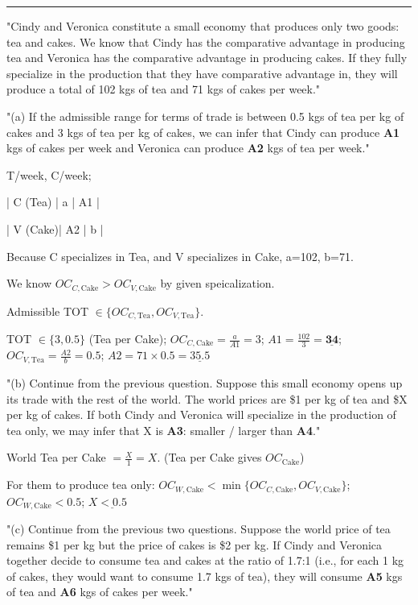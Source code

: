 \documentclass[a4paper]{article}
\begin{document}
\begin{multicols*}{3}
        \rule{1\linewidth}{0.4pt}

        "Cindy and Veronica constitute a small economy that produces only two goods: tea and cakes. We know that Cindy has the comparative advantage in producing tea and Veronica has the comparative advantage in producing cakes. If they fully specialize in the production that they have comparative advantage in, they will produce a total of 102 kgs of tea and 71 kgs of cakes per week."

        "(a) If the admissible range for terms of trade is between 0.5 kgs of tea per kg of cakes and 3 kgs of tea per kg of cakes, we can infer that Cindy can produce \textbf{A1} kgs of cakes per week and Veronica can produce \textbf{A2} kgs of tea per week."

        T/week, C/week;

        | C (Tea)   | a             | A1             |

        | V (Cake)| A2             | b             |

        Because C specializes in Tea, and V specializes in Cake, a=102, b=71.

        We know $OC_{C,\text{Cake}} > OC_{V,\text{Cake}}$ by given speicalization.

        Admissible TOT $\in \{OC_{C,\text{Tea}}, OC_{V,\text{Tea}}\}$.

        TOT $\in \{3, 0.5\}$ (Tea per Cake); $OC_{C,\text{Cake}} = \frac{a}{A1} = 3$; $A1 = \frac{102}{3} = \underline{\mathbf{34}}$; $OC_{V,\text{Tea}} = \frac{A2}{b} = 0.5$; $A2 = 71\times0.5 = \underline{\mathbf{35.5}}$

        "(b) Continue from the previous question. Suppose this small economy opens up its trade with the rest of the world. The world prices are \$1 per kg of tea and \$X per kg of cakes. If both Cindy and Veronica will specialize in the production of tea only, we may infer that X is \textbf{A3}: smaller / larger than \textbf{A4}."

        World Tea per Cake $= \frac{X}{1} = X$. (Tea per Cake gives $OC_\text{Cake}$)

        For them to produce tea only: $OC_{W,\text{Cake}} <\min\{OC_{C,\text{Cake}}, OC_{V,\text{Cake}}\}$; $OC_{W,\text{Cake}} <0.5$; $X \underline{\mathbf{<0.5}}$

        "(c) Continue from the previous two questions. Suppose the world price of tea remains \$1 per kg but the price of cakes is \$2 per kg. If Cindy and Veronica together decide to consume tea and cakes at the ratio of 1.7:1 (i.e., for each 1 kg of cakes, they would want to consume 1.7 kgs of tea), they will consume \textbf{A5} kgs of tea and \textbf{A6} kgs of cakes per week."


\end{multicols*}
\end{document}
